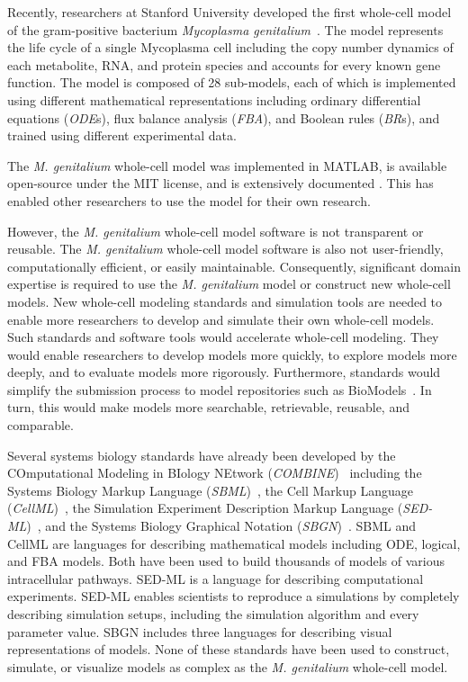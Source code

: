 \documentclass[journal,transmag]{IEEEtran}
\begin{document}
Recently, researchers at Stanford University developed the first whole-cell model of the gram-positive bacterium \textit{Mycoplasma genitalium}~\cite{Karr2012}. The model represents the life cycle of a single Mycoplasma cell including the copy number dynamics of each metabolite, RNA, and protein species and accounts for every known gene function. The model is composed of 28 sub-models, each of which is implemented using different mathematical representations including ordinary differential equations (\emph{ODE}s), flux balance analysis (\emph{FBA}), and Boolean rules (\emph{BR}s), and trained using different experimental data.

The \textit{M. genitalium} whole-cell model was implemented in MATLAB, is available open-source under the MIT license, and is extensively documented \cite{wholeCell}. This has enabled other researchers to use the model for their own research. 

However, the \textit{M. genitalium} whole-cell model software is not transparent or reusable. The \textit{M. genitalium} whole-cell model software is also not user-friendly, computationally efficient, or easily maintainable. Consequently, significant domain expertise is required to use the \textit{M. genitalium} model or construct new whole-cell models. New whole-cell modeling standards and simulation tools are needed to enable more researchers to develop and simulate their own whole-cell models. Such standards and software tools would accelerate whole-cell modeling. They would enable researchers to develop models more quickly, to explore models more deeply, and to evaluate models more rigorously. Furthermore, standards would simplify the submission process to model repositories such as BioModels~\cite{juty2015biomodels,chelliah2015biomodels}. In turn, this would make models more searchable, retrievable, reusable, and comparable.

Several systems biology standards have already been developed by the COmputational Modeling in BIology NEtwork (\emph{COMBINE})~\cite{le2011meeting} including the Systems Biology Markup Language (\emph{SBML})~\cite{hucka2003}, the Cell Markup Language (\emph{CellML})~\cite{hedley_2001b}, the Simulation Experiment Description Markup Language (\emph{SED-ML})~\cite{sedml2011}, and the Systems Biology Graphical Notation (\emph{SBGN})~\cite{LeNovereHMMSS09}. SBML and CellML are languages for describing mathematical models including ODE, logical, and FBA models. Both have been used to build thousands of models of various intracellular pathways. SED-ML is a language for describing computational experiments. SED-ML enables scientists to reproduce a simulations by completely describing simulation setups, including the simulation algorithm and every parameter value. SBGN includes three languages for describing visual representations of models. None of these standards have been used to construct, simulate, or visualize models as complex as the \textit{M. genitalium} whole-cell model.
\end{document}

